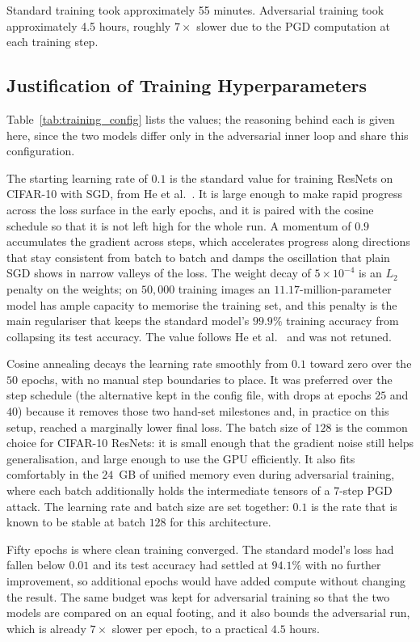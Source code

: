 Standard training took approximately 55 minutes. Adversarial training took approximately 4.5 hours, roughly $7\times$ slower due to the PGD computation at each training step.

\subsection{Justification of Training Hyperparameters}

Table~\ref{tab:training_config} lists the values; the reasoning behind each is given here, since the two models differ only in the adversarial inner loop and share this configuration.

The starting learning rate of $0.1$ is the standard value for training ResNets on CIFAR-10 with SGD, from He et al.~\cite{he2016deep}. It is large enough to make rapid progress across the loss surface in the early epochs, and it is paired with the cosine schedule so that it is not left high for the whole run. A momentum of $0.9$ accumulates the gradient across steps, which accelerates progress along directions that stay consistent from batch to batch and damps the oscillation that plain SGD shows in narrow valleys of the loss. The weight decay of $5 \times 10^{-4}$ is an $L_2$ penalty on the weights; on $50{,}000$ training images an $11.17$-million-parameter model has ample capacity to memorise the training set, and this penalty is the main regulariser that keeps the standard model's $99.9\%$ training accuracy from collapsing its test accuracy. The value follows He et al.~\cite{he2016deep} and was not retuned.

Cosine annealing decays the learning rate smoothly from $0.1$ toward zero over the $50$ epochs, with no manual step boundaries to place. It was preferred over the step schedule (the alternative kept in the config file, with drops at epochs $25$ and $40$) because it removes those two hand-set milestones and, in practice on this setup, reached a marginally lower final loss. The batch size of $128$ is the common choice for CIFAR-10 ResNets: it is small enough that the gradient noise still helps generalisation, and large enough to use the GPU efficiently. It also fits comfortably in the $24$~GB of unified memory even during adversarial training, where each batch additionally holds the intermediate tensors of a $7$-step PGD attack. The learning rate and batch size are set together: $0.1$ is the rate that is known to be stable at batch $128$ for this architecture.

Fifty epochs is where clean training converged. The standard model's loss had fallen below $0.01$ and its test accuracy had settled at $94.1\%$ with no further improvement, so additional epochs would have added compute without changing the result. The same budget was kept for adversarial training so that the two models are compared on an equal footing, and it also bounds the adversarial run, which is already $7\times$ slower per epoch, to a practical $4.5$ hours.

